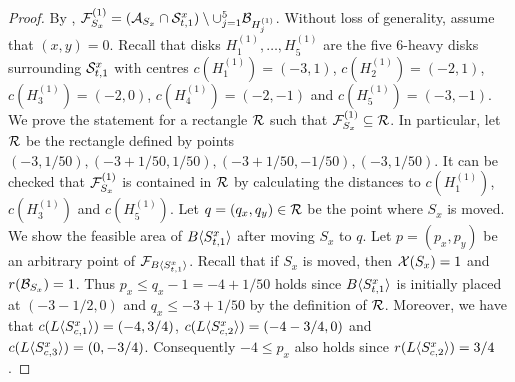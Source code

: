 \begin{toappendix}
\begin{toappendix}
\begin{proof}
    By , $\F_{S_x}^{(1)} = (\A_{S_x}\cap \S^x_{t,1})\setminus \cup_{j=1}^5 \B_{H_j^{(1)}}$. %
    Without loss of generality, assume that $(x,y) = 0$.
    Recall that disks $H_1^{(1)},\ldots,H_5^{(1)}$ are the five $6$-heavy disks surrounding $\S^x_{t,1}$ with centres $c(H_1^{(1)}) = (-3,1)$, $c(H_2^{(1)}) = (-2,1)$, $c(H_3^{(1)}) = (-2,0)$, $c(H_4^{(1)}) = (-2,-1)$ and $c(H_5^{(1)}) = (-3,-1)$.
    We prove the statement for a rectangle $\R$ such that $\F_{S_x}^{(1)} \subseteq \R$. %
    In particular, let $\R$ be the rectangle defined by points $(-3,1/50),(-3+1/50,1/50),(-3+1/50,-1/50), (-3,1/50)$.
    It can be checked that $\F_{S_x}^{(1)}$ is contained in $\R$ by calculating the distances to $c(H_1^{(1)})$, $c(H_3^{(1)})$ and $c(H_5^{(1)})$.
    Let $q = (q_x,q_y) \in \R$ be the point where $S_x$ is moved.
    We show the feasible area of $\bdisk{S_{t,1}^x}$ after moving $S_x$ to $q$.
    Let $p = (p_x, p_y)$ be an arbitrary point of $\F_{\bdisk{S_{t,1}^x}}$.
    Recall that if $S_x$ is moved, then $\ismoved{S_x} = 1$ and $r(\B_{S_x}) = 1$.
    Thus $p_x \le q_x - 1 = -4 + 1/50$ holds since $\bdisk{S_{t,1}^x}$ is initially placed at $(-3-1/2,0)$ and $q_x \le -3 +1/50$ by the definition of $\R$.
    Moreover, we have that $c(\ldisk{S^x_{c,1}}) = (-4,3/4)$, $c(\ldisk{S^x_{c,2}}) = (-4-3/4,0)$ and $c(\ldisk{S^x_{c,3}}) = (0,-3/4)$.
    Consequently $-4 \le p_x$ also holds since $r(\ldisk{S_{c,2}^x}) = 3/4$.
    

\end{proof}
\end{toappendix}
\end{toappendix}
